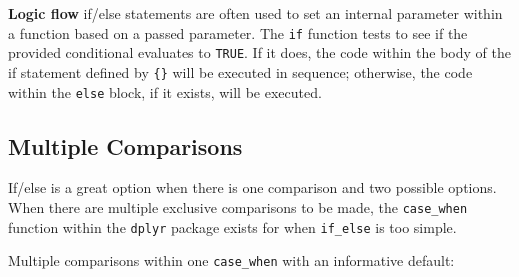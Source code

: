 \documentclass[
]{book}
\begin{document}
\textbf{Logic flow} if/else statements are often used to set an internal parameter within a function based on a passed parameter. The \texttt{if} function tests to see if the provided conditional evaluates to \texttt{TRUE}. If it does, the code within the body of the if statement defined by \texttt{\{\}} will be executed in sequence; otherwise, the code within the \texttt{else} block, if it exists, will be executed.

\subsection{Multiple Comparisons}\label{sec:CaseWhen}

If/else is a great option when there is one comparison and two possible options. When there are multiple exclusive comparisons to be made, the \texttt{case\_when} function within the \texttt{dplyr} package exists for when \texttt{if\_else} is too simple.

Multiple comparisons within one \texttt{case\_when} with an informative default:
\end{document}
